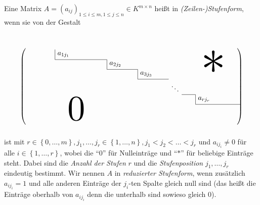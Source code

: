 \documentclass[../../main.tex]{subfiles}
\begin{document}
\begin{df}\label{5.1.10}
Eine Matrix $A=(a_{ij})_{1\leq i\leq m, 1\leq j\leq n}\in K^{m\times n}$ heißt in \emph{(Zeilen-)Stufenform}, wenn sie von der Gestalt

\[
\begin{tikzpicture}
  \matrix(A)[matrix of math nodes,left delimiter=(,right delimiter=)]
  {
    &[3em]a_{1j_1} &[5em]&[2em]&[2em]&[2em]&[3em]\\
    &&a_{2j_2}\\
    &&&a_{3j_3}\\
    &&&&\ddots\\
    &&&&&a_{rj_r}\\
    {}\\
    {}\\
    {}\\
    {}\\
  };
    \draw (A-1-2.north west) -- (A-1-2.south west) -|(A-2-3.south west) -|(A-3-4.south west) -|(A-4-5.north west);
    \draw (A-4-5.south east) -|(A-5-6.south west) -- (A-5-6.south east) -- ([shift={(4em,0)}]A-5-6.south east);
\node[anchor=south west,scale=5] at ([shift={(4em,-1em)}]A.south west) {0};
\node[anchor=north east,scale=7] at ([shift={(1em,2em)}]A.north east) {*};
\end{tikzpicture}
\]
ist mit $r\in \left\{0,\ldots,m\right\}, j_1,\ldots,j_r\in \left\{1,\ldots,n\right\}, j_1<j_2<\ldots<j_r$ und $a_{i{j_i}}\neq 0$ für alle $i\in\left\{1,\ldots,r\right\}$, wobei die "`$0$"' für Nulleinträge und "`$*$"' für beliebige Einträge steht.
Dabei sind die \emph{Anzahl der Stufen} $r$ und die \emph{Stufenposition} $j_1,\ldots,j_r$ eindeutig bestimmt. Wir nennen $A$ in \emph{reduzierter Stufenform}, wenn zusätzlich $a_{ij_i}=1$ und alle anderen Einträge der $j_i$-ten Spalte gleich null sind
(das heißt die Einträge oberhalb von $a_{ij_i}$ denn die unterhalb sind sowieso gleich 0).
\end{df}
\end{document}
